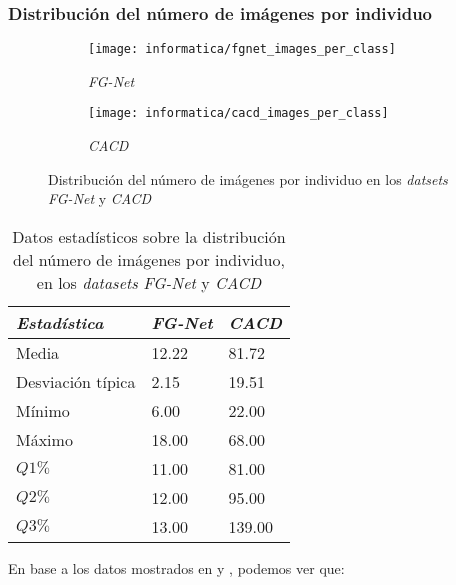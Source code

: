 \subsubsection{Distribución del número de imágenes por individuo}

\begin{figure}[H]
\centering
    \begin{subfigure}{.5\textwidth}
        \centering
        \texttt{[image: informatica/fgnet\_images\_per\_class]}
        \caption{\textit{FG-Net}}
    \end{subfigure}%
    \begin{subfigure}{.5\textwidth}
        \centering
        \texttt{[image: informatica/cacd\_images\_per\_class]}
        \caption{\textit{CACD}}
    \end{subfigure}
\caption{Distribución del número de imágenes por individuo en los \textit{datsets} \textit{FG-Net} y \textit{CACD} }
    \label{img:comparativa_imagenes_por_individuo}
\end{figure}


\begin{table}[H]
\centering
\begin{tabular}{|l|l|l|}
    \hline
    \textbf{\textit{Estadística}} & \textbf{\textit{FG-Net}} & \textbf{\textit{CACD}} \\
    \hline

    Media             & 12.22 & 81.72  \\
    Desviación típica & 2.15  & 19.51  \\
    Mínimo            & 6.00  & 22.00  \\
    Máximo            & 18.00 & 68.00  \\
    $Q1 \%$           & 11.00 & 81.00  \\
    $Q2 \%$           & 12.00 & 95.00  \\
    $Q3 \%$           & 13.00 & 139.00 \\

    \hline

\end{tabular}
\caption{Datos estadísticos sobre la distribución del número de imágenes por individuo, en los \textit{datasets} \textit{FG-Net} y \textit{CACD}}
    \label{table:comparativa_imagenes_por_individuo}
\end{table}

En base a los datos mostrados en  y , podemos ver que:

